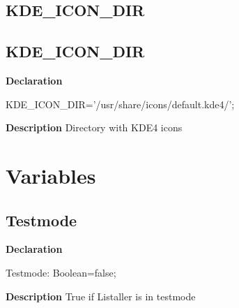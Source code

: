 \documentclass{report}
\newif\ifpdf
\begin{document}
\subsection*{\large{\textbf{KDE{\_}ICON{\_}DIR}}\normalsize\hspace{1ex}\hrulefill}
\else
\subsection*{KDE{\_}ICON{\_}DIR}
\fi
\label{common-KDE_ICON_DIR}
\begin{list}{}{
\setlength{\itemindent}{0cm}
\setlength{\listparindent}{0cm}
\setlength{\leftmargin}{\evensidemargin}
\addtolength{\leftmargin}{\tmplength}
\settowidth{\labelsep}{X}
\addtolength{\leftmargin}{\labelsep}
\setlength{\labelwidth}{\tmplength}
}
\item[\textbf{Declaration}\hfill]
\ifpdf
\begin{flushleft}
\fi
\begin{ttfamily}
KDE{\_}ICON{\_}DIR='/usr/share/icons/default.kde4/';\end{ttfamily}

\ifpdf
\end{flushleft}
\fi

\par
\item[\textbf{Description}]
Directory with KDE4 icons

\end{list}
\section{Variables}
\ifpdf
\subsection*{\large{\textbf{Testmode}}\normalsize\hspace{1ex}\hrulefill}
\else
\subsection*{Testmode}
\fi
\label{common-Testmode}
\begin{list}{}{
\setlength{\itemindent}{0cm}
\setlength{\listparindent}{0cm}
\setlength{\leftmargin}{\evensidemargin}
\addtolength{\leftmargin}{\tmplength}
\settowidth{\labelsep}{X}
\addtolength{\leftmargin}{\labelsep}
\setlength{\labelwidth}{\tmplength}
}
\item[\textbf{Declaration}\hfill]
\ifpdf
\begin{flushleft}
\fi
\begin{ttfamily}
Testmode: Boolean=false;\end{ttfamily}

\ifpdf
\end{flushleft}
\fi

\par
\item[\textbf{Description}]
True if Listaller is in testmode

\end{list}
\end{document}
